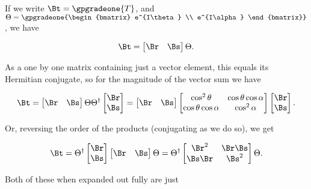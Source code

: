 If we write $\Bt = \gpgradeone{T}$, and $\Theta = \gpgradeone{\begin{bmatrix} e^{I\theta} \\ e^{I\alpha} \end{bmatrix}}$, we have

\begin{align}\label{eqn:mp140}
\Bt = 
\begin{bmatrix}
\Br & \Bs 
\end{bmatrix}
\Theta.
\end{align}

As a one by one matrix containing just a vector element, this equals its Hermitian conjugate, so for the magnitude of the vector sum we have

\begin{align}\label{eqn:mp150}
\Bt 
= 
\begin{bmatrix}
\Br & \Bs 
\end{bmatrix}
\Theta
\Theta^\dagger
\begin{bmatrix}
\Br \\ \Bs 
\end{bmatrix}
=
\begin{bmatrix}
\Br & \Bs 
\end{bmatrix}
\begin{bmatrix}
\cos^2 \theta & \cos\theta \cos\alpha \\
\cos\theta \cos\alpha & \cos^2 \alpha
\end{bmatrix}
\begin{bmatrix}
\Br \\ \Bs 
\end{bmatrix}.
\end{align}

Or, reversing the order of the products (conjugating as we do so), we get

\begin{align}\label{eqn:mp160}
\Bt = 
\Theta^\dagger
\begin{bmatrix}
\Br \\ \Bs 
\end{bmatrix}
\begin{bmatrix}
\Br & \Bs 
\end{bmatrix}
\Theta
=
\Theta^\dagger
\begin{bmatrix}
\Br^2 & \Br\Bs \\
\Bs\Br & \Bs^2
\end{bmatrix}
\Theta.
\end{align}

Both of these when expanded out fully are just

